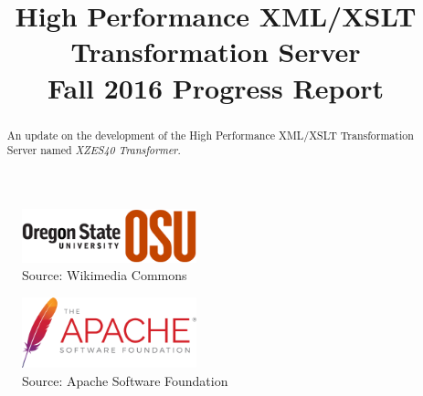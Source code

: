 

\title{
	High Performance XML/XSLT Transformation Server \\
    {
    	\LARGE Fall 2016 Progress Report 
    }
}
\author{
}



\maketitle
\begin{abstract}
  An update on the development of the High Performance XML/XSLT Transformation Server named \textit{XZES40 Transformer}.
\end{abstract}

\begin{figure}[h]
  \begin{centering}
    \includegraphics[width=0.45\textwidth]{figures/osu-logo}
    \caption{Source: Wikimedia Commons \cite{osu-logo}}
  \end{centering}
\end{figure}

\begin{figure}[h]
  \begin{centering}
    \includegraphics[width=0.45\textwidth]{figures/asf-logo}
    \caption{Source: Apache Software Foundation \cite{asf-logo}}
  \end{centering}
\end{figure}

\clearpage

